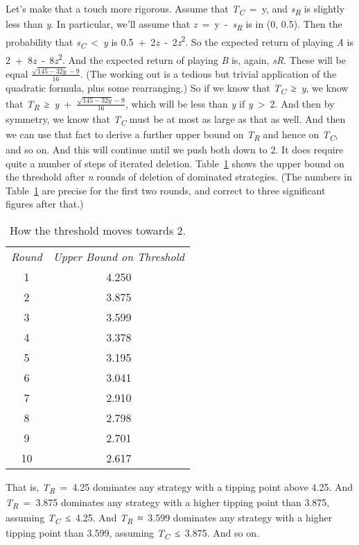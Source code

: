 \documentclass[
  12pt,
  letterpaper,
]{scrbook}
\begin{document}
Let's make that a touch more rigorous. Assume that
\emph{T\textsubscript{C}}~=~y, and \emph{s\textsubscript{R}} is slightly
less than \emph{y}. In particular, we'll assume that
\emph{z}~=~y~-~\emph{s\textsubscript{R}} is in (0, 0.5). Then the
probability that \emph{s\textsubscript{C}}~\textless~\emph{y} is
0.5~+~2\emph{z}~‑~2\emph{z}\textsuperscript{2}. So the expected return
of playing \emph{A} is 2~+~8\emph{z}~‑~8\emph{z}\textsuperscript{2}. And
the expected return of playing \emph{B} is, again, \emph{sR}. These will
be equal \(\frac{\sqrt{145-32y}-9}{16}\). (The working out is a tedious
but trivial application of the quadratic formula, plus some
rearranging.) So if we know that \emph{T\textsubscript{C}}~≥~\emph{y},
we know that
\emph{T\textsubscript{R}}~≥~\emph{y}~+~\(\frac{\sqrt{145-32y}-9}{16}\),
which will be less than \emph{y} if \emph{y}~\textgreater~2. And then by
symmetry, we know that \emph{T\textsubscript{C}} must be at most as
large as that as well. And then we can use that fact to derive a further
upper bound on \emph{T\textsubscript{R}} and hence on
\emph{T\textsubscript{C}}, and so on. And this will continue until we
push both down to 2. It does require quite a number of steps of iterated
deletion. Table~\ref{tbl-threshold} shows the upper bound on the
threshold after \emph{n} rounds of deletion of dominated strategies.
(The numbers in Table~\ref{tbl-threshold} are precise for the first two
rounds, and correct to three significant figures after that.)

\begin{longtable}[]{@{}cc@{}}
\caption{How the threshold moves towards
2.}\label{tbl-threshold}\tabularnewline
\toprule\noalign{}
\endfirsthead
\endhead
\bottomrule\noalign{}
\endlastfoot
\emph{Round} & \emph{Upper Bound on Threshold} \\
1 & 4.250 \\
2 & 3.875 \\
3 & 3.599 \\
4 & 3.378 \\
5 & 3.195 \\
6 & 3.041 \\
7 & 2.910 \\
8 & 2.798 \\
9 & 2.701 \\
10 & 2.617 \\
\end{longtable}

That is, \emph{T\textsubscript{R}}~=~4.25 dominates any strategy with a
tipping point above 4.25. And \emph{T\textsubscript{R}}~=~3.875
dominates any strategy with a higher tipping point than 3.875, assuming
\emph{T\textsubscript{C}}~≤~4.25. And \emph{T\textsubscript{R}}~≈~3.599
dominates any strategy with a higher tipping point than 3.599, assuming
\emph{T\textsubscript{C}}~≤~3.875. And so on.
\end{document}
